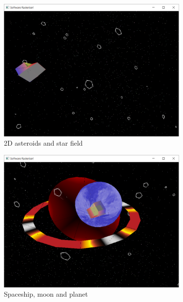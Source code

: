 \documentclass[a4paper]{article}
\begin{document}
\begin{figure}[h!]
  \centering
  \includegraphics[width=0.85\textwidth]{graphics/screen_4.eps}
  \caption{2D asteroids and star field}
  \label{fig:screen_4}
\end{figure}

\begin{figure}[h!]
  \centering
  \includegraphics[width=0.85\textwidth]{graphics/screen_5.eps}
  \caption{Spaceship, moon and planet}
  \label{fig:screen_5}
\end{figure}
\end{document}
